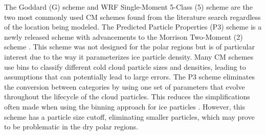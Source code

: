 The Goddard (G) scheme \citep{tao:2000} and WRF Single-Moment 5-Class (5) scheme \citep{hong:2004} are the two most commonly used CM schemes found from the literature search regardless of the location being modeled. The Predicted Particle Properties (P3) scheme is a newly released scheme with advancements to the Morrison Two-Moment (2) scheme \citep{milbrandt:2016, morrison:2015}. This scheme was not designed for the polar regions but is of particular interest due to the way it parameterizes ice particle density. Many CM schemes use bins to classify different cold cloud particle sizes and densities, leading to assumptions that can potentially lead to large errors. The P3 scheme eliminates the conversion between categories by using one set of parameters that evolve throughout the lifecycle of the cloud particles. This reduces the simplifications often made when using the binning approach for ice particles \citep{morrison:2005}. However, this scheme has a particle size cutoff, eliminating smaller particles, which may prove to be problematic in the dry polar regions.

